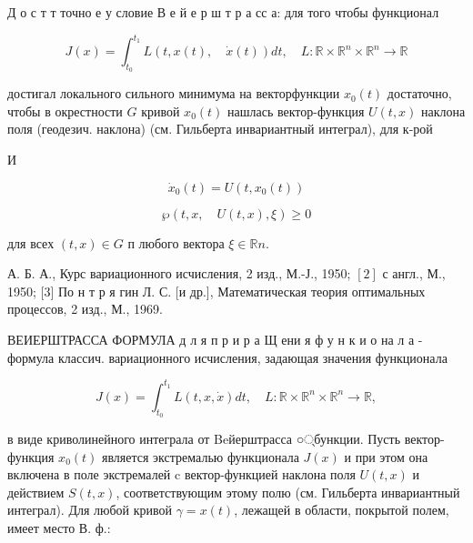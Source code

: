 \documentclass[10pt]{article}
\begin{document}
Д о с т т точно е у словие В е й е р ш т р а сс а: для того чтобы функционал



\[

J(x)=\int_{t_{0}}^{t_{1}} L(t, x(t), \quad \dot{x}(t)) d t, \quad L: \mathbb{R} \times \mathbb{R}^{n} \times \mathbb{R}^{n} \longrightarrow \mathbb{R}

\]



достигал локального сильного минимума на векторфункции $x_{0}(t)$ достаточно, чтобы в окрестности $G$ кривой $x_{0}(t)$ нашлась вектор-функция $U(t, x)$ наклона поля (геодезич. наклона) (см. Гильберта инвариантный интеграл), для к-рой



И



\[

\dot{x}_{0}(t)=U\left(t, x_{0}(t)\right)

\]



\[

\mathscr{\wp}(t, x, \quad U(t, x), \xi) \geqslant 0

\]



для всех $(t, x) \in G$ п любого вектора $\xi \in \mathbb{R} n$.



А. Б. А., Курс вариационного исчисления, 2 изд., М.-Ј., 1950; $[2]$ с англ., М., 1950; [3] По н т р я гин Л. С. [и др.], Математическая теория оптимальных процессов, 2 изд., М., 1969.



ВЕИЕРШТРАССА ФОРМУЛА д л я п р и р а Щ ени я ф у н к и о на л а - формула классич. вариационного исчисления, задающая значения функционала



\[

J(x)=\int_{t_{0}}^{t_{1}} L(t, x, \dot{x}) d t, \quad L: \mathbb{R} \times \mathbb{R}^{n} \times \mathbb{R}^{n} \longrightarrow \mathbb{R},

\]



в виде криволинейного интеграла от Beйерштрасса ○्бункции. Пусть вектор-функция $x_{0}(t)$ является экстремалью функционала $J(x)$ и при этом она включена в поле экстремалей c вектор-функцией наклона поля $U(t, x)$ и действием $S(t, x)$, соответствующим этому полю (см. Гильберта инвариантный интеграл). Для любой кривой $\gamma=x(t)$, лежащей в области, покрытой полем, имеет место В. ф.:
\end{document}
